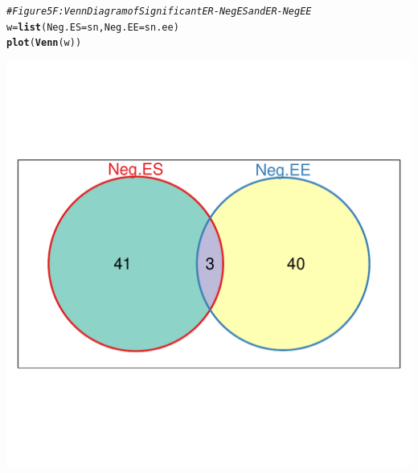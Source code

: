 \documentclass{article}\usepackage[]{graphicx}\usepackage[]{color}
\makeatletter
\def\maxwidth{ %
  \ifdim\Gin@nat@width>\linewidth
    \linewidth
  \else
    \Gin@nat@width
  \fi
}
\newcommand{\hlcom}[1]{\textcolor[rgb]{0.678,0.584,0.686}{\textit{#1}}}%
\newcommand{\hlstd}[1]{\textcolor[rgb]{0.345,0.345,0.345}{#1}}%
\newcommand{\hlkwb}[1]{\textcolor[rgb]{0.69,0.353,0.396}{#1}}%
\newcommand{\hlkwc}[1]{\textcolor[rgb]{0.333,0.667,0.333}{#1}}%
\newcommand{\hlkwd}[1]{\textcolor[rgb]{0.737,0.353,0.396}{\textbf{#1}}}%
\newenvironment{kframe}{%
 \def\at@end@of@kframe{}%
 \ifinner\ifhmode%
  \def\at@end@of@kframe{\end{minipage}}%
  \begin{minipage}{\columnwidth}%
 \fi\fi%
 \def\FrameCommand##1{\hskip\@totalleftmargin \hskip-\fboxsep
 \colorbox{shadecolor}{##1}\hskip-\fboxsep
     \hskip-\linewidth \hskip-\@totalleftmargin \hskip\columnwidth}%
 \MakeFramed {\advance\hsize-\width
   \@totalleftmargin\z@ \linewidth\hsize
   \@setminipage}}%
 {\par\unskip\endMakeFramed%
 \at@end@of@kframe}
\newenvironment{knitrout}{}{} %
\makeatother
\begin{document}
\begin{knitrout}
\begin{kframe}\begin{alltt}
\hlcom{# Figure 5F: Venn Diagram of Significant ER-Neg ES and ER-Neg EE}
\hlstd{w}\hlkwb{=}\hlkwd{list}\hlstd{(}\hlkwc{Neg.ES}\hlstd{=sn,}\hlkwc{Neg.EE}\hlstd{=sn.ee)}
\hlkwd{plot}\hlstd{(}\hlkwd{Venn}\hlstd{(w))}
\end{alltt}
\end{kframe}
\includegraphics[width=\maxwidth]{figure/Figure_4__Analysis_of_SANTA_Results-10} 

\end{knitrout}
\end{document}
